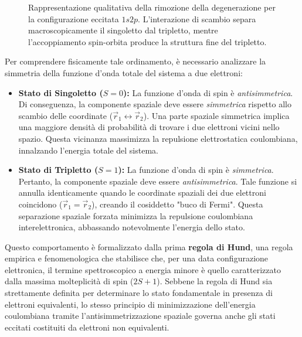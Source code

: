 \begin{exercise}
\begin{solution}
\begin{figure}[htbp]
    \caption{Rappresentazione qualitativa della rimozione della degenerazione per la configurazione eccitata \( 1s 2p \). L'interazione di scambio separa macroscopicamente il singoletto dal tripletto, mentre l'accoppiamento spin-orbita produce la struttura fine del tripletto.}
    \label{fig:splitting_1s2p}
\end{figure}

Per comprendere fisicamente tale ordinamento, è necessario analizzare la simmetria della funzione d'onda totale del sistema a due elettroni:
\begin{itemize}
    \item \textbf{Stato di Singoletto (\( S=0 \)):} La funzione d'onda di spin è \textit{antisimmetrica}. Di conseguenza, la componente spaziale deve essere \textit{simmetrica} rispetto allo scambio delle coordinate (\( \vec{r}_1 \leftrightarrow \vec{r}_2 \)). Una parte spaziale simmetrica implica una maggiore densità di probabilità di trovare i due elettroni vicini nello spazio. Questa vicinanza massimizza la repulsione elettrostatica coulombiana, innalzando l'energia totale del sistema.
    \item \textbf{Stato di Tripletto (\( S=1 \)):} La funzione d'onda di spin è \textit{simmetrica}. Pertanto, la componente spaziale deve essere \textit{antisimmetrica}. Tale funzione si annulla identicamente quando le coordinate spaziali dei due elettroni coincidono (\( \vec{r}_1 = \vec{r}_2 \)), creando il cosiddetto "buco di Fermi". Questa separazione spaziale forzata minimizza la repulsione coulombiana interelettronica, abbassando notevolmente l'energia dello stato.
\end{itemize}

Questo comportamento è formalizzato dalla prima \textbf{regola di Hund}, una regola empirica e fenomenologica che stabilisce che, per una data configurazione elettronica, il termine spettroscopico a energia minore è quello caratterizzato dalla massima molteplicità di spin (\( 2S+1 \)). Sebbene la regola di Hund sia strettamente definita per determinare lo stato fondamentale in presenza di elettroni equivalenti, lo stesso principio di minimizzazione dell'energia coulombiana tramite l'antisimmetrizzazione spaziale governa anche gli stati eccitati costituiti da elettroni non equivalenti.


\end{solution}
\end{exercise}
